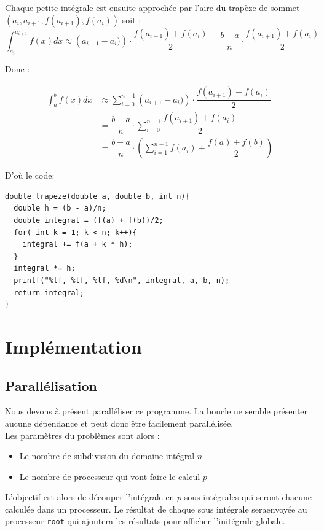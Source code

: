 \documentclass{article}
\begin{document}
Chaque petite intégrale est ensuite approchée par l'aire du trapèze de sommet $(a_i, a_{i+1}, f(a_{i+1}), f(a_i))$ soit :\\

\[
\int_{a_i}^{a_{i+1}}f(x)dx \approx \left(a_{i+1}-a_i)\right)\cdot\dfrac{f(a_{i+1})+f({a_i})}{2} = \dfrac{b-a}{n}\cdot\dfrac{f(a_{i+1})+f({a_i})}{2}
\]

Donc : 

\begin{align*}
    \int_{a}^{b}f(x)dx &\approx \sum_{i=0}^{n-1}\left(a_{i+1}-a_i)\right)\cdot\dfrac{f(a_{i+1})+f({a_i})}{2} \\
    &= \dfrac{b-a}{n}\cdot\sum_{i=0}^{n-1}\dfrac{f(a_{i+1})+f({a_i})}{2}\\
    &= \dfrac{b-a}{n}\cdot\left(\sum_{i=1}^{n-1}f(a_{i}) + \dfrac{f(a) + f(b)}{2}\right)
\end{align*}

D'où le code:

\begin{lstlisting}[style=ccode, morekeywords={f}]
double trapeze(double a, double b, int n){
  double h = (b - a)/n;
  double integral = (f(a) + f(b))/2;
  for( int k = 1; k < n; k++){
    integral += f(a + k * h);
  }
  integral *= h;
  printf("%lf, %lf, %lf, %d\n", integral, a, b, n);
  return integral;
}
\end{lstlisting}

\section{Implémentation}
\subsection{Parallélisation}

Nous devons à présent paralléliser ce programme.
La boucle ne semble présenter aucune dépendance et peut donc être facilement parallélisée.\\

Les paramètres du problèmes sont alors : 
\begin{itemize}
    \item Le nombre de subdivision du domaine intégral $n$
    \item Le nombre de processeur qui vont faire le calcul $p$
\end{itemize}

L'objectif est alors de découper l'intégrale en $p$ sous intégrales qui seront chacune calculée dans un processeur.
Le résultat de chaque sous intégrale seraenvoyée au processeur \texttt{root} qui ajoutera les résultats pour afficher l'initégrale globale.\\
\end{document}
